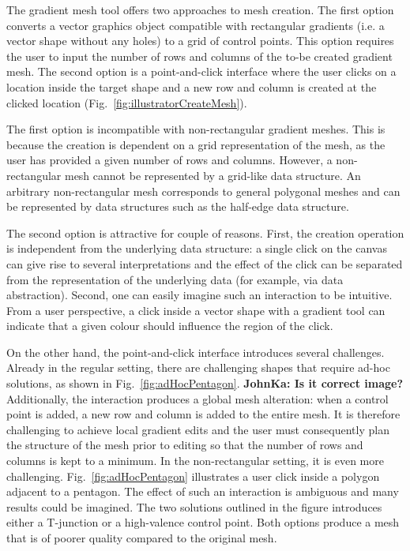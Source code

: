 \documentclass{egpubl}
\newcommand{\note}[3]{{\color{#2}\textbf{#1: #3}}}
\newcommand{\john}[1]{\note{JohnKa}{RubineRed}{#1}}
\begin{document}
The gradient mesh tool offers two approaches to mesh creation. The first option converts a vector graphics object compatible with rectangular gradients (i.e. a vector shape without any holes) to a grid of control points. This option requires the user to input the number of rows and columns of the to-be created gradient mesh. The second option is a point-and-click interface where the user clicks on a location inside the target shape and a new row and column is created at the clicked location (Fig.~\ref{fig:illustratorCreateMesh}).

The first option is incompatible with non-rectangular gradient meshes. This is because the creation is dependent on a grid representation of the mesh, as the user has provided a given number of rows and columns. However, a non-rectangular mesh cannot be represented by a grid-like data structure. An arbitrary non-rectangular mesh corresponds to general polygonal meshes and can be represented by data structures such as the half-edge data structure.

The second option is attractive for couple of reasons. First, the creation operation is independent from the underlying data structure: a single click on the canvas can give rise to several interpretations and the effect of the click can be separated from the representation of the underlying data (for example, via data abstraction). Second, one can easily imagine such an interaction to be intuitive. From a user perspective, a click inside a vector shape with a gradient tool can indicate that a given colour should influence the region of the click.

On the other hand, the point-and-click interface introduces several challenges. Already in the regular setting, there are challenging shapes that require ad-hoc solutions, as shown in Fig.~\ref{fig:adHocPentagon}. \john{Is it correct image?} Additionally, the interaction produces a global mesh alteration: when a control point is added, a new row and column is added to the entire mesh. It is therefore challenging to achieve local gradient edits and the user must consequently plan the structure of the mesh prior to editing so that the number of rows and columns is kept to a minimum. In the non-rectangular setting, it is even more challenging. Fig.~\ref{fig:adHocPentagon} illustrates a user click inside a polygon adjacent to a pentagon. The effect of such an interaction is ambiguous and many results could be imagined. The two solutions outlined in the figure introduces either a T-junction or a high-valence control point. Both options produce a mesh that is of poorer quality compared to the original mesh.
\end{document}
